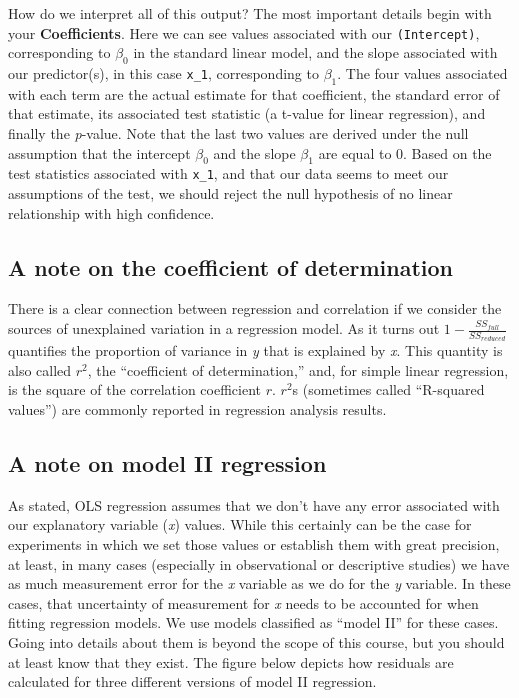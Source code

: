 \documentclass[
]{book}
\begin{document}
How do we interpret all of this output? The most important details begin with your \textbf{Coefficients}. Here we can see values associated with our \texttt{(Intercept)}, corresponding to \(\beta_0\) in the standard linear model, and the slope associated with our predictor(s), in this case \texttt{x\_1}, corresponding to \(\beta_1\). The four values associated with each term are the actual estimate for that coefficient, the standard error of that estimate, its associated test statistic (a t-value for linear regression), and finally the \emph{p}-value. Note that the last two values are derived under the null assumption that the intercept \(\beta_0\) and the slope \(\beta_1\) are equal to 0. Based on the test statistics associated with \texttt{x\_1}, and that our data seems to meet our assumptions of the test, we should reject the null hypothesis of no linear relationship with high confidence.

\hypertarget{a-note-on-the-coefficient-of-determination}{%
\subsection{A note on the coefficient of determination}\label{a-note-on-the-coefficient-of-determination}}

There is a clear connection between regression and correlation if we consider the sources of unexplained variation in a regression model. As it turns out \(1-\frac{SS_{full}}{SS_{reduced}}\) quantifies the proportion of variance in \emph{y} that is explained by \emph{x}. This quantity is also called \(r^2\), the ``coefficient of determination,'' and, for simple linear regression, is the square of the correlation coefficient \(r\). \(r^2\)s (sometimes called ``R-squared values'') are commonly reported in regression analysis results.

\hypertarget{a-note-on-model-ii-regression}{%
\subsection{A note on model II regression}\label{a-note-on-model-ii-regression}}

As stated, OLS regression assumes that we don't have any error associated with our explanatory variable (\emph{x}) values. While this certainly can be the case for experiments in which we set those values or establish them with great precision, at least, in many cases (especially in observational or descriptive studies) we have as much measurement error for the \emph{x} variable as we do for the \emph{y} variable. In these cases, that uncertainty of measurement for \emph{x} needs to be accounted for when fitting regression models. We use models classified as ``model II'' for these cases. Going into details about them is beyond the scope of this course, but you should at least know that they exist. The figure below depicts how residuals are calculated for three different versions of model II regression.
\end{document}

